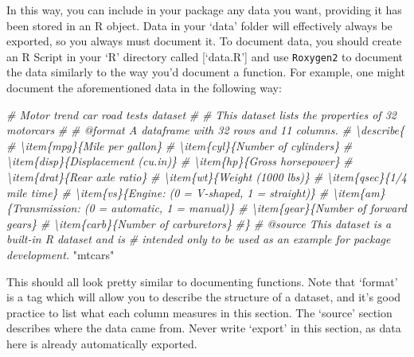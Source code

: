 \documentclass[
]{book}
\newenvironment{Shaded}{\begin{snugshade}}{\end{snugshade}}
\newcommand{\CommentTok}[1]{\textcolor[rgb]{0.56,0.35,0.01}{\textit{#1}}}
\newcommand{\StringTok}[1]{\textcolor[rgb]{0.31,0.60,0.02}{#1}}
\begin{document}
In this way, you can include in your package any data you want, providing it has been stored in an R object. Data in your `data' folder will effectively always be exported, so you always must document it. To document data, you should create an R Script in your `R' directory called {[}`data.R'{]} and use \texttt{Roxygen2} to document the data similarly to the way you'd document a function. For example, one might document the aforementioned data in the following way:

\begin{Shaded}
\begin{Highlighting}[]
\CommentTok{\#\textquotesingle{} Motor trend car road tests dataset}
\CommentTok{\#\textquotesingle{}}
\CommentTok{\#\textquotesingle{} This dataset lists the properties of 32 motorcars}
\CommentTok{\#\textquotesingle{}}
\CommentTok{\#\textquotesingle{} @format A dataframe with 32 rows and 11 columns.}
\CommentTok{\#\textquotesingle{} \textbackslash{}describe\{}
\CommentTok{\#\textquotesingle{}   \textbackslash{}item\{mpg\}\{Mile per gallon\}}
\CommentTok{\#\textquotesingle{}   \textbackslash{}item\{cyl\}\{Number of cylinders\}}
\CommentTok{\#\textquotesingle{}   \textbackslash{}item\{disp\}\{Displacement (cu.in)\}}
\CommentTok{\#\textquotesingle{}   \textbackslash{}item\{hp\}\{Gross horsepower\}}
\CommentTok{\#\textquotesingle{}   \textbackslash{}item\{drat\}\{Rear axle ratio\}}
\CommentTok{\#\textquotesingle{}   \textbackslash{}item\{wt\}\{Weight (1000 lbs)\}}
\CommentTok{\#\textquotesingle{}   \textbackslash{}item\{qsec\}\{1/4 mile time\}}
\CommentTok{\#\textquotesingle{}   \textbackslash{}item\{vs\}\{Engine: (0 = V{-}shaped, 1 = straight)\}}
\CommentTok{\#\textquotesingle{}   \textbackslash{}item\{am\}\{Transmission: (0 = automatic, 1 = manual)\}}
\CommentTok{\#\textquotesingle{}   \textbackslash{}item\{gear\}\{Number of forward gears\}}
\CommentTok{\#\textquotesingle{}   \textbackslash{}item\{carb\}\{Number of carburetors\}}
\CommentTok{\#\textquotesingle{}\}}
\CommentTok{\#\textquotesingle{} @source This dataset is a built{-}in R dataset and is}
\CommentTok{\#\textquotesingle{} intended only to be used as an example for package development.}
\StringTok{"mtcars"}
\end{Highlighting}
\end{Shaded}

This should all look pretty similar to documenting functions. Note that `format' is a tag which will allow you to describe the structure of a dataset, and it's good practice to list what each column measures in this section. The `source' section describes where the data came from. Never write `export' in this section, as data here is already automatically exported.
\end{document}
